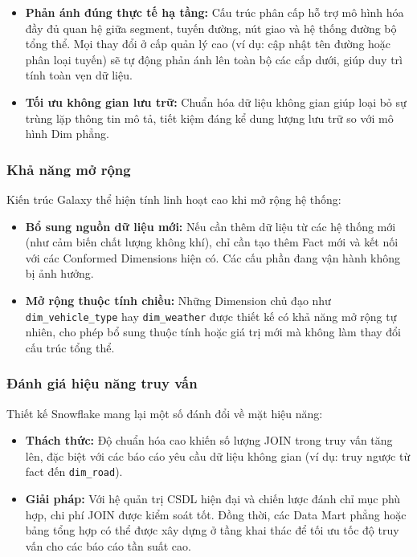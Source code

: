 \begin{itemize}
    \item \textbf{Phản ánh đúng thực tế hạ tầng:} Cấu trúc phân cấp hỗ trợ mô hình hóa đầy đủ quan hệ giữa segment, tuyến đường, nút giao và hệ thống đường bộ tổng thể. Mọi thay đổi ở cấp quản lý cao (ví dụ: cập nhật tên đường hoặc phân loại tuyến) sẽ tự động phản ánh lên toàn bộ các cấp dưới, giúp duy trì tính toàn vẹn dữ liệu.
    
    \item \textbf{Tối ưu không gian lưu trữ:} Chuẩn hóa dữ liệu không gian giúp loại bỏ sự trùng lặp thông tin mô tả, tiết kiệm đáng kể dung lượng lưu trữ so với mô hình Dim phẳng.
\end{itemize}

\subsubsection{Khả năng mở rộng}
Kiến trúc Galaxy thể hiện tính linh hoạt cao khi mở rộng hệ thống:

\begin{itemize}
    \item \textbf{Bổ sung nguồn dữ liệu mới:} Nếu cần thêm dữ liệu từ các hệ thống mới (như cảm biến chất lượng không khí), chỉ cần tạo thêm Fact mới và kết nối với các Conformed Dimensions hiện có. Các cấu phần đang vận hành không bị ảnh hưởng.
    
    \item \textbf{Mở rộng thuộc tính chiều:} Những Dimension chủ đạo như \texttt{dim\_vehicle\_type} hay \texttt{dim\_weather} được thiết kế có khả năng mở rộng tự nhiên, cho phép bổ sung thuộc tính hoặc giá trị mới mà không làm thay đổi cấu trúc tổng thể.
\end{itemize}

\subsubsection{Đánh giá hiệu năng truy vấn}
Thiết kế Snowflake mang lại một số đánh đổi về mặt hiệu năng:

\begin{itemize}
    \item \textbf{Thách thức:} Độ chuẩn hóa cao khiến số lượng JOIN trong truy vấn tăng lên, đặc biệt với các báo cáo yêu cầu dữ liệu không gian (ví dụ: truy ngược từ fact đến \texttt{dim\_road}).
    
    \item \textbf{Giải pháp:} Với hệ quản trị CSDL hiện đại và chiến lược đánh chỉ mục phù hợp, chi phí JOIN được kiểm soát tốt. Đồng thời, các Data Mart phẳng hoặc bảng tổng hợp có thể được xây dựng ở tầng khai thác để tối ưu tốc độ truy vấn cho các báo cáo tần suất cao.
\end{itemize}

